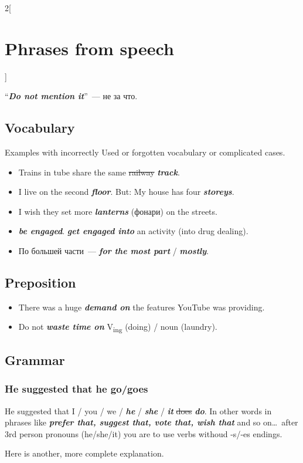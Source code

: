 \documentclass[10pt,a4paper]{article}
\newlength{\OriginalParIndent}
\newcommand\ex[1]{\textit{\textbf{{#1}}}}           %
\newenvironment{ItemizeWithOrigParIndent}
    {\begin{itemize}[leftmargin=\OriginalParIndent]}
    {\end{itemize}}
\begin{document}
\begin{multicols}{2}[\section{Phrases from speech}]
\begin{ItemizeWithOrigParIndent}
   ``\ex{Do not mention it}''~--- не за что.

\end{ItemizeWithOrigParIndent}

\subsection{Vocabulary}
Examples with incorrectly Used or forgotten vocabulary or complicated cases.

\begin{ItemizeWithOrigParIndent}
   \item Trains in tube share the same \sout{railway} \ex{track}.
   \item I live on the second \ex{floor}. But: My house has four \ex{storeys}.
   \item I wish they set more \ex{lanterns} (фонари) on the streets.
   \item \ex{be engaged}. \ex{get engaged into} an activity (into drug dealing).
   \item По большей части~--- \ex{for the most part} / \ex{mostly}.
\end{ItemizeWithOrigParIndent}


\subsection{Preposition}
\begin{ItemizeWithOrigParIndent}
   \item There was a huge \ex{demand on} the features YouTube was providing.
   \item Do not \ex{waste time on} V\textsubscript{ing} (doing) / noun (laundry).
\end{ItemizeWithOrigParIndent}


\subsection{Grammar}
\subsubsection{He suggested that he go/goes}
   He suggested that I / you / we / \ex{he} / \ex{she} / \ex{it} \sout{does} \ex{do}. In other words in phrases like \ex{prefer that, suggest that, vote that, wish that} and so on\dots\ after 3rd person pronouns (he/she/it) you are to use verbs withoud -s/-es endings.

   Here is another, more complete explanation.


\end{multicols}
\end{document}
